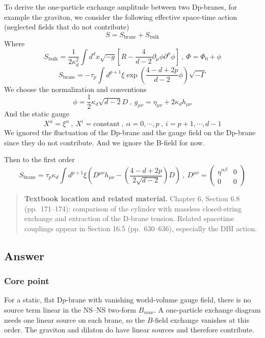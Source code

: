 \documentclass[
  10pt,
  a4paper,
  openany]{book}
\begin{document}
To derive the one-particle exchange amplitude between two Dp-branes, for
example the graviton, we consider the following effective space-time
action (neglected fields that do not contribute) \[
S=S_{\text{brane}}+S_{\text{bulk}}
\] Where \[
S_{\text{bulk}}=\frac{1}{2\kappa_{d}^2}\int d^dx\sqrt{ -g }\left[ R-\frac{4}{d-2}\partial_{\mu}\phi\partial^\mu \phi \right] \ , \ \Phi=\Phi_{0}+\phi
\] \[
S_{\text{brane}}=-\tau_{p}\int d^{p+1}\xi \exp\left( \frac{{4-d+2p}}{d-2}\phi \right)\sqrt{ -\Gamma }
\] We choose the normalization and conventions \[
\phi=\frac{1}{2}\kappa_{d}\sqrt{ d-2 }D \ , \ g_{\mu \nu}=\eta_{\mu \nu}+2\kappa_{d}h_{\mu \nu}
\] And the static gauge \[
X^\alpha=\xi^\alpha \ , \ X^i=\text{constant} \ , \ \alpha=0,\cdots,p \ , \ i=p+1,\cdots,d-1
\] We ignored the fluctuation of the Dp-brane and the gauge field on the
Dp-brane since they do not contribute. And we ignore the B-field for
now.

Then to the first order \[
S_{\text{brane}}=\tau_{p}\kappa_{d}\int d^{p+1}\xi\left( D^{\mu \nu}h_{\mu \nu}-\left( \frac{{4-d+2p}}{2\sqrt{ d-2 }} \right)D \right) \ , \ D^{\mu \nu}=\begin{pmatrix}
\eta^{\alpha\beta} & 0 \\
0 & 0
\end{pmatrix}
\]

\begin{quote}
\textbf{Textbook location and related material.} Chapter 6, Section 6.8
(pp.~171--174): comparison of the cylinder with massless closed-string
exchange and extraction of the D-brane tension. Related spacetime
couplings appear in Section 16.5 (pp.~630--636), especially the DBI
action.
\end{quote}

\subsection{Answer}\label{answer-2}

\subsubsection{Core point}\label{core-point-2}

For a static, flat D\(p\)-brane with vanishing world-volume gauge field,
there is no source term linear in the NS--NS two-form \(B_{mu\nu}\). A
one-particle exchange diagram needs one linear source on each brane, so
the \(B\)-field exchange vanishes at this order. The graviton and
dilaton do have linear sources and therefore contribute.
\end{document}
